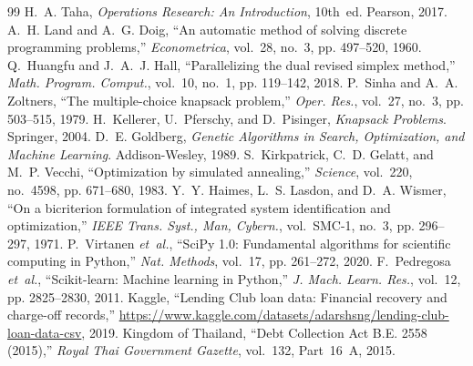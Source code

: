 \documentclass[10pt,a4paper]{article}
\begin{document}
\begin{thebibliography}{99}
 H.~A. Taha, \emph{Operations Research: An Introduction}, 10th~ed. Pearson, 2017.
 A.~H. Land and A.~G. Doig, ``An automatic method of solving discrete programming problems,'' \emph{Econometrica}, vol.~28, no.~3, pp. 497--520, 1960.
 Q.~Huangfu and J.~A.~J. Hall, ``Parallelizing the dual revised simplex method,'' \emph{Math. Program. Comput.}, vol.~10, no.~1, pp. 119--142, 2018.
 P.~Sinha and A.~A. Zoltners, ``The multiple-choice knapsack problem,'' \emph{Oper. Res.}, vol.~27, no.~3, pp. 503--515, 1979.
 H.~Kellerer, U.~Pferschy, and D.~Pisinger, \emph{Knapsack Problems}. Springer, 2004.
 D.~E. Goldberg, \emph{Genetic Algorithms in Search, Optimization, and Machine Learning}. Addison-Wesley, 1989.
 S.~Kirkpatrick, C.~D. Gelatt, and M.~P. Vecchi, ``Optimization by simulated annealing,'' \emph{Science}, vol.~220, no.~4598, pp. 671--680, 1983.
 Y.~Y. Haimes, L.~S. Lasdon, and D.~A. Wismer, ``On a bicriterion formulation of integrated system identification and optimization,'' \emph{IEEE Trans. Syst., Man, Cybern.}, vol.~SMC-1, no.~3, pp. 296--297, 1971.
 P.~Virtanen \emph{et~al.}, ``SciPy 1.0: Fundamental algorithms for scientific computing in Python,'' \emph{Nat. Methods}, vol.~17, pp. 261--272, 2020.
 F.~Pedregosa \emph{et~al.}, ``Scikit-learn: Machine learning in Python,'' \emph{J. Mach. Learn. Res.}, vol.~12, pp. 2825--2830, 2011.
 Kaggle, ``Lending Club loan data: Financial recovery and charge-off records,'' \url{https://www.kaggle.com/datasets/adarshsng/lending-club-loan-data-csv}, 2019.
 Kingdom of Thailand, ``Debt Collection Act B.E. 2558 (2015),'' \emph{Royal Thai Government Gazette}, vol.~132, Part~16~A, 2015.
\end{thebibliography}
\end{document}
